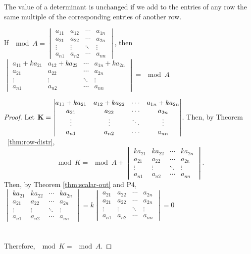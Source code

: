 \newpage
\begin{theorem}\label{thm:row-distr}
  The value of a determinant is unchanged if we add to the entries of any row the same multiple of the corresponding entries of another row.

\begin{center}
  If $\mod{A} =
  \begin{vmatrix}
    a_{11} & a_{12} & \cdots & a_{1n}\\
    a_{21} & a_{22} & \cdots & a_{2n}\\
    \vdots & \vdots & \ddots & \vdots\\
    a_{n1} & a_{n2} & \cdots & a_{nn}
  \end{vmatrix}$, then $
  \begin{vmatrix}
    a_{11} + ka_{21} & a_{12}+ka_{22} & \cdots & a_{1n} + ka_{2n}\\
    a_{21} & a_{22} & \cdots & a_{2n}\\
    \vdots & \vdots & \ddots & \vdots\\
    a_{n1} & a_{n2} & \cdots & a_{nn}
  \end{vmatrix} = \mod{A}$
\end{center}  

\end{theorem}
\begin{proof}
Let  $\mathbf{K} =\begin{vmatrix}
    a_{11} + ka_{21} & a_{12}+ka_{22} & \cdots & a_{1n} + ka_{2n}\\
    a_{21} & a_{22} & \cdots & a_{2n}\\
    \vdots & \vdots & \ddots & \vdots\\
    a_{n1} & a_{n2} & \cdots & a_{nn}
  \end{vmatrix}$. Then, by Theorem ~\ref{thm:row-distr}, \[\mod{K} = \mod{A} + 
\begin{vmatrix}
    ka_{21} & ka_{22} & \cdots & ka_{2n}\\
    a_{21} & a_{22} & \cdots & a_{2n}\\
    \vdots & \vdots & \ddots & \vdots\\
    a_{n1} & a_{n2} & \cdots & a_{nn}
  \end{vmatrix}.\]
  Then, by Theorem \ref{thm:scalar-out} and P4, 
$ 
  \begin{vmatrix}
    ka_{21} & ka_{22} & \cdots & ka_{2n}\\
    a_{21} & a_{22} & \cdots & a_{2n}\\
    \vdots & \vdots & \ddots & \vdots\\
    a_{n1} & a_{n2} & \cdots & a_{nn}
  \end{vmatrix} 
  =
  k\begin{vmatrix}
    a_{21} & a_{22} & \cdots & a_{2n}\\
    a_{21} & a_{22} & \cdots & a_{2n}\\
    \vdots & \vdots & \ddots & \vdots\\
    a_{n1} & a_{n2} & \cdots & a_{nn}
  \end{vmatrix}
  = 0
$
~\\~\\~\\Therefore, $\mod{K} = \mod{A}$.
\end{proof}
